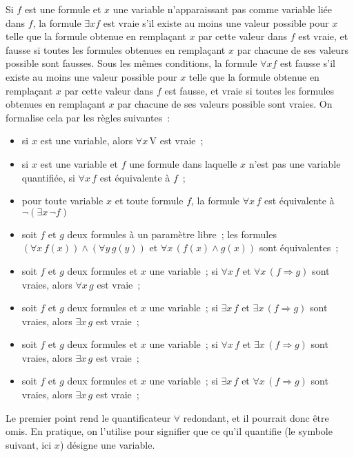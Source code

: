 Si $f$ est une formule et $x$ une variable n'apparaissant pas comme variable liée dans $f$, la formule $\exists x f$ est vraie s'il existe au moins une valeur possible pour $x$ telle que la formule obtenue en remplaçant $x$ par cette valeur dans $f$ est vraie, et fausse si toutes les formules obtenues en remplaçant $x$ par chacune de ses valeurs possible sont fausses. 
Sous les mêmes conditions, la formule $\forall x f$ est fausse s'il existe au moins une valeur possible pour $x$ telle que la formule obtenue en remplaçant $x$ par cette valeur dans $f$ est fausse, et vraie si toutes les formules obtenues en remplaçant $x$ par chacune de ses valeurs possible sont vraies. 
On formalise cela par les règles suivantes : 
\begin{itemize}
    \item si $x$ est une variable, alors $\forall x \, \mathrm{V}$ est vraie ; 
    \item si $x$ est une variable et $f$ une formule dans laquelle $x$ n'est pas une variable quantifiée, si $\forall x \, f$ est équivalente à $f$ ; 
    \item pour toute variable $x$ et toute formule $f$, la formule $\forall x \, f$ est équivalente à $\neg (\exists x \, \neg f)$ 
    \item soit $f$ et $g$ deux formules à un paramètre libre ; les formules $(\forall x \, f(x)) \wedge (\forall y \, g(y))$ et $\forall x \, (f(x) \wedge g(x))$ sont équivalentes ; 
    \item soit $f$ et $g$ deux formules et $x$ une variable ; si $\forall x \, f$ et $\forall x \, (f \Rightarrow g)$ sont vraies, alors $\forall x \, g$ est vraie ; 
    \item soit $f$ et $g$ deux formules et $x$ une variable ; si $\exists x \, f$ et $\exists x \, (f \Rightarrow g)$ sont vraies, alors $\exists x \, g$ est vraie ; 
    \item soit $f$ et $g$ deux formules et $x$ une variable ; si $\forall x \, f$ et $\exists x \, (f \Rightarrow g)$ sont vraies, alors $\exists x \, g$ est vraie ; 
    \item soit $f$ et $g$ deux formules et $x$ une variable ; si $\exists x \, f$ et $\forall x \, (f \Rightarrow g)$ sont vraies, alors $\exists x \, g$ est vraie ; 
\end{itemize}
Le premier point rend le quantificateur $\forall$ redondant, et il pourrait donc être omis. 
En pratique, on l'utilise pour signifier que ce qu'il quantifie (le symbole suivant, ici $x$) désigne une variable. 

